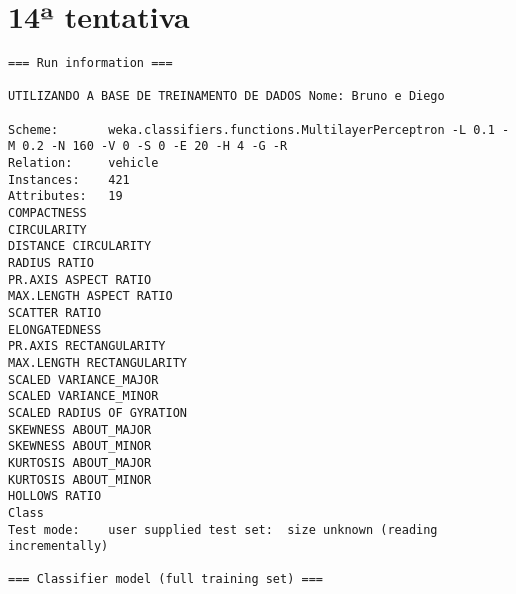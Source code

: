 \documentclass[
	article,			%
	11pt,				%
	oneside,			%
	a4paper,			%
	english,			%
	brazil,				%
	sumario=tradicional
	]{abntex2}
\begin{document}
\section{14ª tentativa}

\begin{lstlisting}
=== Run information ===

UTILIZANDO A BASE DE TREINAMENTO DE DADOS Nome: Bruno e Diego

Scheme:       weka.classifiers.functions.MultilayerPerceptron -L 0.1 -M 0.2 -N 160 -V 0 -S 0 -E 20 -H 4 -G -R
Relation:     vehicle
Instances:    421
Attributes:   19
COMPACTNESS
CIRCULARITY
DISTANCE CIRCULARITY
RADIUS RATIO
PR.AXIS ASPECT RATIO
MAX.LENGTH ASPECT RATIO
SCATTER RATIO
ELONGATEDNESS
PR.AXIS RECTANGULARITY
MAX.LENGTH RECTANGULARITY
SCALED VARIANCE_MAJOR
SCALED VARIANCE_MINOR
SCALED RADIUS OF GYRATION
SKEWNESS ABOUT_MAJOR
SKEWNESS ABOUT_MINOR
KURTOSIS ABOUT_MAJOR
KURTOSIS ABOUT_MINOR
HOLLOWS RATIO
Class
Test mode:    user supplied test set:  size unknown (reading incrementally)

=== Classifier model (full training set) ===


\end{lstlisting}
\end{document}
